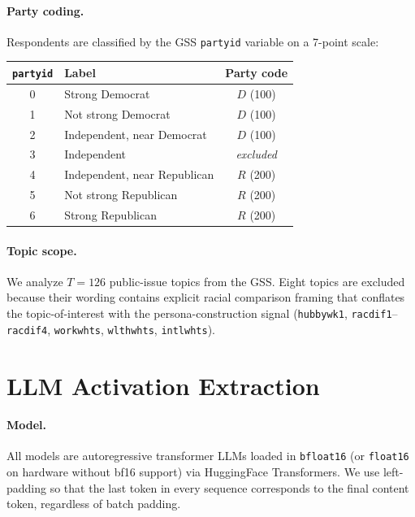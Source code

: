 \documentclass[12pt]{article}
\begin{document}
\paragraph{Party coding.}
Respondents are classified by the GSS \texttt{partyid} variable on a 7-point scale:

\begin{center}
\begin{tabular}{clc}
\toprule
\texttt{partyid} & Label & Party code \\
\midrule
0 & Strong Democrat & $D$ (100) \\
1 & Not strong Democrat & $D$ (100) \\
2 & Independent, near Democrat & $D$ (100) \\
3 & Independent & \textit{excluded} \\
4 & Independent, near Republican & $R$ (200) \\
5 & Not strong Republican & $R$ (200) \\
6 & Strong Republican & $R$ (200) \\
\bottomrule
\end{tabular}
\end{center}

\paragraph{Topic scope.}
We analyze $T = 126$ public-issue topics from the GSS. Eight topics are excluded because their wording contains explicit racial comparison framing that conflates the topic-of-interest with the persona-construction signal (\texttt{hubbywk1}, \texttt{racdif1}--\texttt{racdif4}, \texttt{workwhts}, \texttt{wlthwhts}, \texttt{intlwhts}).

\section{LLM Activation Extraction}
\label{sec:extraction}

\paragraph{Model.}
All models are autoregressive transformer LLMs loaded in \texttt{bfloat16} (or \texttt{float16} on hardware without bf16 support) via HuggingFace Transformers. We use left-padding so that the last token in every sequence corresponds to the final content token, regardless of batch padding.
\end{document}

